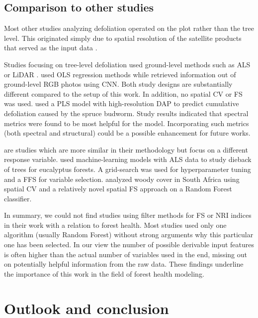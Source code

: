 \documentclass[letterpaper, journal]{IEEEtran}
\begin{document}
\subsection{Comparison to other studies}

\noindent Most other studies analyzing defoliation operated on the plot rather than the tree level.
This originated simply due to spatial resolution of the satellite products that served as the input data \cite{townsend2012, debeurs2008a, rengarajan2016}.

Studies focusing on tree-level defoliation used ground-level methods such as \ac{ALS} or \ac{LiDAR} \cite{meng2018, kalin2019}.
\cite{meng2018} used \ac{OLS} regression methods while \cite{kalin2019} retrieved information out of ground-level RGB photos using \ac{CNN}.
Both study designs are substantially different compared to the setup of this work.
In addition, no spatial \ac{CV} or \ac{FS} was used.
\cite{goodbody2018} used a \ac{PLS} model with high-resolution \ac{DAP} to predict cumulative defoliation caused by the spruce budworm.
Study results indicated that spectral metrics were found to be most helpful for the model.
Incorporating such metrics (both spectral and structural) could be a possible enhancement for future works.

\cite{shendryk2016, ludwig2019} are studies which are more similar in their methodology but focus on a different response variable.
\cite{shendryk2016} used machine-learning models with \ac{ALS} data to study dieback of trees for eucalyptus forests.
A grid-search was used for hyperparameter tuning and a \ac{FFS} for variable selection.
\cite{ludwig2019} analyzed woody cover in South Africa using spatial \ac{CV} and a relatively novel spatial \ac{FS} approach \cite{meyer2018} on a Random Forest classifier.

In summary, we could not find studies using filter methods for \ac{FS} or \ac{NRI} indices in their work with a relation to forest health.
Most studies used only one algorithm (usually Random Forest) without strong arguments why this particular one has been selected.
In our view the number of possible derivable input features is often higher than the actual number of variables used in the end, missing out on potentially helpful information from the raw data.
These findings underline the importance of this work in the field of forest health modeling.

\section{Outlook and conclusion}
\end{document}
